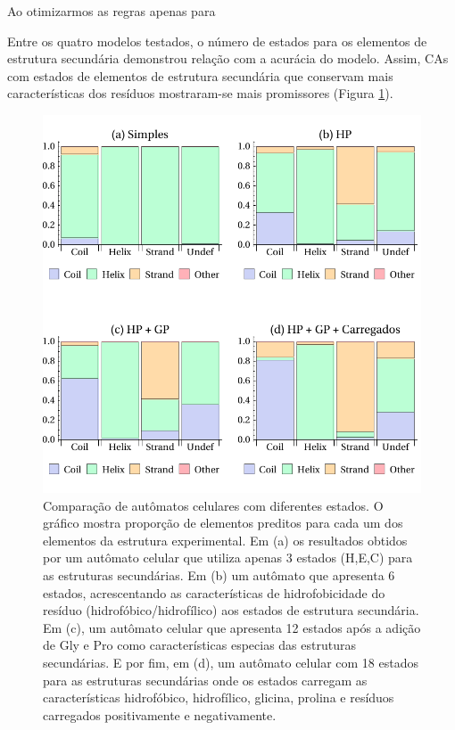 Ao otimizarmos as regras apenas para 

Entre os quatro modelos testados, o número de estados para os elementos de estrutura secundária demonstrou relação com a acurácia do modelo. Assim, CAs com estados de elementos de estrutura secundária que conservam mais características dos resíduos mostraram-se mais promissores (Figura \ref{fig:ca_errors}).

\begin{figure}
  \centering
  \includegraphics[width=.9\textwidth]{figures/chamel_errors_ca.pdf}
  \caption{Comparação de autômatos celulares com diferentes estados. O gráfico mostra proporção de elementos preditos para cada um dos elementos da estrutura experimental. Em (a) os resultados obtidos por um autômato celular que utiliza apenas 3 estados (H,E,C) para as estruturas secundárias. Em (b) um autômato que apresenta 6 estados, acrescentando as características de hidrofobicidade do resíduo (hidrofóbico/hidrofílico) aos estados de estrutura secundária. Em (c), um autômato celular que apresenta 12 estados após a adição de Gly e Pro como características especias das estruturas secundárias. E por fim, em (d), um autômato celular com 18 estados para as estruturas secundárias onde os estados carregam as características hidrofóbico, hidrofílico, glicina, prolina e resíduos carregados positivamente e negativamente.} 
        \label{fig:ca_errors}
\end{figure}

